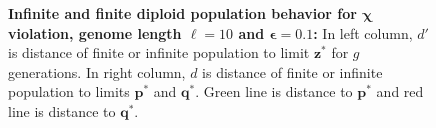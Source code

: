 \begin{figure}[h]
\begin{center}
\hspace{-3em}%
\vspace{-0.5em}  \hspace{-3em}%


\caption[\textbf{Infinite and finite diploid population behavior for $\bm{\chi}$ violation, genome length $\ell = 10$ and $\bm{\epsilon} = 0.1$}]{\textbf{Infinite and finite diploid population behavior for $\bm{\chi}$ violation, genome length $\ell = 10$ and $\bm{\epsilon} = 0.1$:} 
  In left column, $d'$ is distance of finite or infinite population to limit $\bm{z}^\ast$ for $g$ generations. In right column, $d$ is distance of finite or infinite population to limits $\bm{p}^\ast$ and $\bm{q}^\ast$. Green line is distance to $\bm{p}^\ast$ and red line is distance to $\bm{q}^\ast$.}
\label{oscillation_10d_vio_chi_0.1}
\end{center}
\end{figure}

